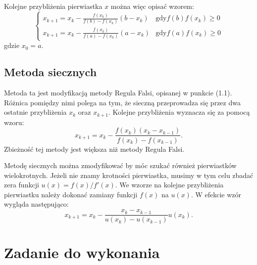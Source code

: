 \documentclass{article}
\begin{document}
Kolejne przybliżenia pierwiastka $x$ można więc opisać wzorem:
\begin{equation}
\begin{cases} 
	x_{k+1} = x_k - \frac{f(x_k)}{f(b) - f(x_k)} (b - x_k) & \text{gdy} f(b)f(x_k) \geq 0  \\
	x_{k+1} = x_k - \frac{f(x_k)}{f(a) - f(x_k)} (a - x_k) & \text{gdy} f(a)f(x_k) \geq 0
\end{cases}
\end{equation}
gdzie $x_0 = a$.

\subsection{Metoda siecznych}
Metoda ta jest modyfikacją metody Regula Falsi, opisanej w punkcie (1.1). Różnica pomiędzy nimi polega na tym, że sieczną przeprowadza się przez dwa ostatnie przybliżenia $x_k$ oraz $x_{k+1}$. Kolejne przybliżenia wyznacza się za pomocą wzoru:
\begin{equation}
x_{k+1} = x_k - \frac{f(x_k)(x_k - x_{k-1})}{f(x_k) - f(x_{k-1})}. 
\end{equation}
Zbieżność tej metody jest większa niż metody Regula Falsi. 
\par Metodę siecznych można zmodyfikować by móc szukać również pierwiastków wielokrotnych. Jeżeli nie znamy krotności pierwiastka, musimy w tym celu zbadać zera funkcji $u(x) = f(x)/f'(x)$. We wzorze na kolejne przybliżenia pierwiastku należy dokonać zamiany funkcji $f(x)$ na $u(x)$. W efekcie wzór wygląda następująco:
\begin{equation}
x_{k+1} = x_{k} - \frac{x_k - x_{k-1}}{u(x_k) - u(x_{k-1})} u(x_k).
\end{equation}


\section{Zadanie do wykonania}
\end{document}
